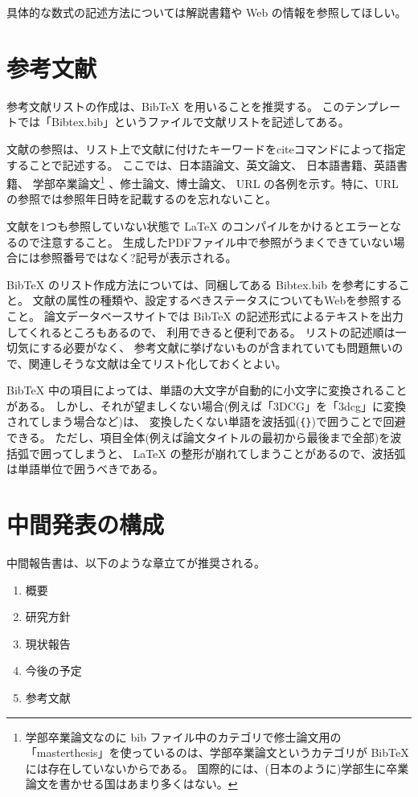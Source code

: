 \documentclass[12pt,a4paper,uplatex,dvipdfmx]{jsarticle}
\begin{document}
具体的な数式の記述方法については解説書籍や Web の情報を参照してほしい。

\section{参考文献}
\label{sec:bib}

参考文献リストの作成は、BibTeX を用いることを推奨する。
このテンプレートでは「Bibtex.bib」というファイルで文献リストを記述してある。

文献の参照は、リスト上で文献に付けたキーワードをciteコマンドによって指定することで記述する。
ここでは、日本語論文\cite{nito}、英文論文\cite{nowrouzezahrai}、
日本語書籍\cite{godzilla}、英語書籍\cite{gpu-gems2}、
学部卒業論文\cite{takano}\footnote{学部卒業論文なのに bib ファイル中のカテゴリで修士論文用の
「masterthesis」を使っているのは、学部卒業論文というカテゴリが
BibTeX には存在していないからである。
国際的には、(日本のように)学部生に卒業論文を書かせる国はあまり多くはない。}
、修士論文\cite{abeM}、博士論文\cite{takeuchi3}、
URL\cite{zbrush} の各例を示す。特に、URL の参照では参照年日時を記載するのを忘れないこと。

文献を1つも参照していない状態で LaTeX のコンパイルをかけるとエラーとなるので注意すること。
生成したPDFファイル中で参照がうまくできていない場合には参照番号ではなく?記号が表示される。

BibTeX のリスト作成方法については、同梱してある Bibtex.bib を参考にすること。
文献の属性の種類や、設定するべきステータスについてもWebを参照すること。
論文データベースサイトでは BibTeX の記述形式によるテキストを出力してくれるところもあるので、
利用できると便利である。
リストの記述順は一切気にする必要がなく、
参考文献に挙げないものが含まれていても問題無いので、関連しそうな文献は全てリスト化しておくとよい。

BibTeX 中の項目によっては、単語の大文字が自動的に小文字に変換されることがある。
しかし、それが望ましくない場合(例えば「3DCG」を「3dcg」に変換されてしまう場合など)は、
変換したくない単語を波括弧(\verb+{}+)で囲うことで回避できる。
ただし、項目全体(例えば論文タイトルの最初から最後まで全部)を波括弧で囲ってしまうと、
LaTeX の整形が崩れてしまうことがあるので、波括弧は単語単位で囲うべきである。

\section{中間発表の構成}
\label{sec:structure}
中間報告書は、以下のような章立てが推奨される。

\begin{enumerate}
 \item 概要
 \item 研究方針
 \item 現状報告
 \item 今後の予定
 \item 参考文献
\end{enumerate}
\end{document}
